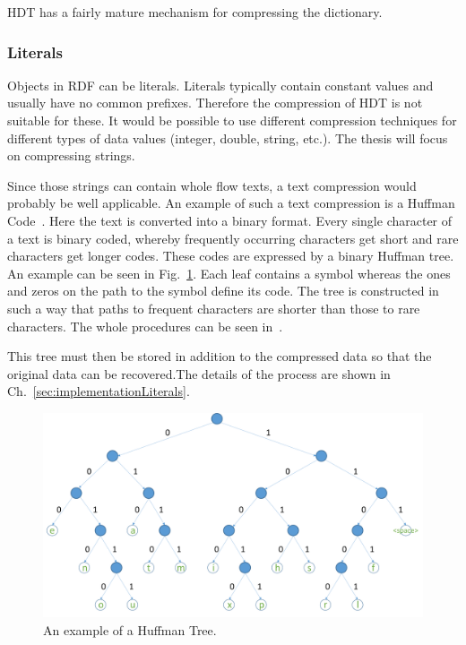 HDT has a fairly mature mechanism for compressing the dictionary.

\subsubsection{Literals}\label{sec:approachLiterals}

Objects in RDF can be literals. Literals typically contain constant values and usually have no common prefixes. Therefore the compression of HDT is not suitable for these. It would be possible to use different compression techniques for different types of data values (integer, double, string, etc.). The thesis will focus on compressing strings.

Since those strings can contain whole flow texts, a text compression would probably be well applicable. An example of such a text compression is a Huffman Code~\cite{huffman}. Here the text is converted into a binary format. Every single character of a text is binary coded, whereby frequently occurring characters get short and rare characters get longer codes. These codes are expressed by a binary Huffman tree. An example can be seen in Fig.~\ref{fig:huffmantree}. Each leaf contains a symbol whereas the ones and zeros on the path to the symbol define its code. The tree is constructed in such a way that paths to frequent characters are shorter than those to rare characters. The whole procedures can be seen in~\cite{huffman}.

This tree must then be stored in addition to the compressed data so that the original data can be recovered.The details of the process are shown in Ch.~\ref{sec:implementationLiterals}.

\begin{figure}
	\centering
	\includegraphics[width=0.9\linewidth]{figures/4_rdf_specific_features/huffman}
	\caption{An example of a Huffman Tree.}
	\label{fig:huffmantree}
\end{figure}

